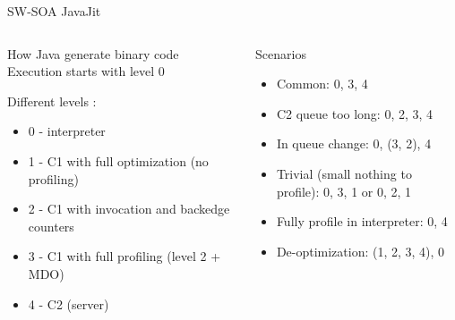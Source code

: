 %
\begin{Frame}{SW-SOA JavaJit}
  \begin{columns}[t]
    \begin{column}{\HW} %
      \begin{block}{How Java generate binary code}
        Execution starts with level 0
        
        Different levels :

        \begin{itemize}
        \item 0 - interpreter
        \item 1 - C1 with full optimization (no profiling)
        \item 2 - C1 with invocation and backedge counters
        \item 3 - C1 with full profiling (level 2 + MDO)
        \item 4 - C2 (server)
        \end{itemize}
      \end{block} 
    \end{column}
    
    \begin{column}{\HW} %
      \begin{block}{Scenarios}
        \begin{itemize}
        \item Common: 0, 3, 4
        \item C2 queue too long: 0, 2, 3, 4
        \item In queue change: 0, (3, 2), 4
        \item Trivial (small nothing to profile): 0, 3, 1 or 0, 2, 1
        \item Fully profile in interpreter: 0, 4
        \item De-optimization: (1, 2, 3, 4), 0
        \end{itemize}
      \end{block}   
    \end{column}
  \end{columns}  
\end{Frame}


